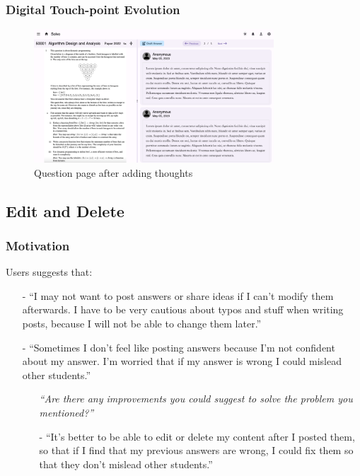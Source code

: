 \documentclass[a4paper]{article}
\begin{document}
    \subsubsection*{Digital Touch-point Evolution}

    \begin{figure}[H]
        \centering
        \includegraphics[width=0.8\textwidth]{question-page3}
        \\ Question page after adding thoughts
    \end{figure}

    \subsection*{Edit and Delete}

    \subsubsection*{Motivation}

    \noindent Users suggests that:
    \begin{itemize}
        \item[-] ``I may not want to post answers or share ideas if I can't modify them afterwards.
        I have to be very cautious about typos and stuff when writing posts, because I will not be able to change them later.''
        \item[-] ``Sometimes I don't feel like posting answers because I'm not confident about my answer.
        I'm worried that if my answer is wrong I could mislead other students.''
        \begin{itemize}
            \item[\textbullet] \textit{``Are there any improvements you could suggest to solve the problem you mentioned?''}
            \item[-] ``It's better to be able to edit or delete my content after I posted them, so that if I find that my previous
            answers are wrong, I could fix them so that they don't mislead other students.''
        \end{itemize}
    \end{itemize}
\end{document}
